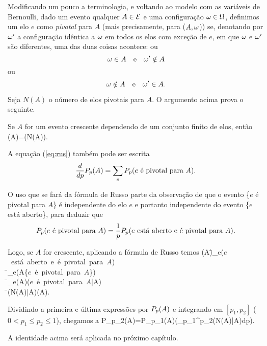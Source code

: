 Modificando um pouco a terminologia, e voltando ao modelo com as variáveis de
Bernoulli, dado um evento qualquer $A\in{\cal E}$ e uma configuração $\omega\in\Omega$, 
definimos um elo $e$ como {\em pivotal} para $A$ (mais precisamente, para
($A,\omega$)) se, denotando por
$\omega'$ a configuração idêntica a $\omega$ em todos os elos com exceção de $e$, em
que $\omega$ e $\omega'$ são diferentes, uma das duas coisas acontece: ou
$$\omega\in A\quad\mbox{e}\quad\omega'\notin A$$
ou
$$\omega\notin A\quad\mbox{e}\quad\omega'\in A.$$

Seja $N(A)$ o número de elos pivotais para $A$. O argumento acima prova o seguinte.

\vs


Se $A$ for um evento crescente dependendo de um conjunto finito de elos,
então
\beq
\label{eq:rus}
\p(A)=\ep(N(A)).
\eeq
\eteo  

\vs

A equação (\ref{eq:rus}) também pode ser escrita
$$
\frac{d}{dp}P_p(A)=\sum_{e}P_p(\mbox{$e$ é pivotal para $A$}).
$$

O uso que se fará da fórmula de Russo parte da observação de
que o evento \{$e$ é pivotal para $A$\} é independente do elo $e$ e portanto
independente do evento \{$e$ está aberto\}, para deduzir que
$$
P_p(\mbox{$e$ é pivotal para $A$})=
\frac{1}{p}P_p(\mbox{$e$ está aberto e é pivotal para $A$}).
$$

Logo, se $A$ for crescente, aplicando a fórmula de Russo temos
\beqn
{}\p(A)\=\sum_{e}\p(\mbox{$e$ está aberto e é pivotal para $A$})\\
\=\sum_{e}\p(A\cap\{\mbox{$e$ é pivotal para $A$}\})\\
\=\sum_{e}\p(A)\p(\mbox{$e$ é pivotal para $A$}|A)\\
\=\ep(N(A)|A)\p(A).
\eeqn

Dividindo a primeira e última expressões por $P_p(A)$ e integrando em
$[p_1,p_2]$ ($0< p_1\leq p_2\leq1$), chegamos a
\beq
P_{p_2}(A)=P_{p_1}(A)\exp\left(\int_{p_1}^{p_2}\ep(N(A)|A)dp\right).
\eeq

A identidade acima será aplicada no próximo capítulo.